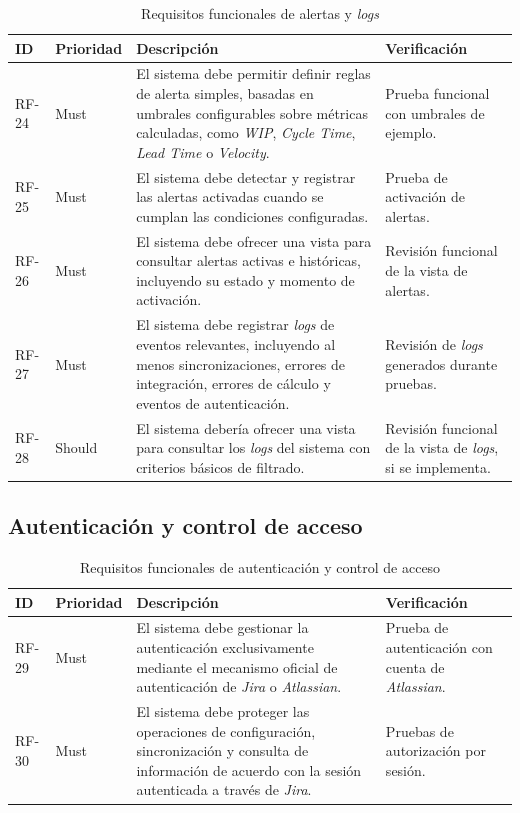{\renewcommand{\arraystretch}{1.28}\footnotesize
\begin{longtable}{p{1.35cm}p{1.65cm}p{6.9cm}p{2.9cm}}
\caption{Requisitos funcionales de alertas y \textit{logs}}\label{tab:rf-alertas-logs}\\
\toprule
\textbf{ID} & \textbf{Prioridad} & \textbf{Descripción} & \textbf{Verificación} \\
\midrule
RF-24 & Must & El sistema debe permitir definir reglas de alerta simples, basadas en umbrales configurables sobre métricas calculadas, como \textit{WIP}, \textit{Cycle Time}, \textit{Lead Time} o \textit{Velocity}. & Prueba funcional con umbrales de ejemplo. \\
RF-25 & Must & El sistema debe detectar y registrar las alertas activadas cuando se cumplan las condiciones configuradas. & Prueba de activación de alertas. \\
RF-26 & Must & El sistema debe ofrecer una vista para consultar alertas activas e históricas, incluyendo su estado y momento de activación. & Revisión funcional de la vista de alertas. \\
RF-27 & Must & El sistema debe registrar \textit{logs} de eventos relevantes, incluyendo al menos sincronizaciones, errores de integración, errores de cálculo y eventos de autenticación. & Revisión de \textit{logs} generados durante pruebas. \\
RF-28 & Should & El sistema debería ofrecer una vista para consultar los \textit{logs} del sistema con criterios básicos de filtrado. & Revisión funcional de la vista de \textit{logs}, si se implementa. \\
\bottomrule
\end{longtable}
\vspace{0.45em}
}

\subsection{Autenticación y control de acceso}

{\renewcommand{\arraystretch}{1.28}\footnotesize
\begin{longtable}{p{1.35cm}p{1.65cm}p{6.9cm}p{2.9cm}}
\caption{Requisitos funcionales de autenticación y control de acceso}\label{tab:rf-autenticacion-control-acceso}\\
\toprule
\textbf{ID} & \textbf{Prioridad} & \textbf{Descripción} & \textbf{Verificación} \\
\midrule
RF-29 & Must & El sistema debe gestionar la autenticación exclusivamente mediante el mecanismo oficial de autenticación de \textit{Jira} o \textit{Atlassian}. & Prueba de autenticación con cuenta de \textit{Atlassian}. \\
RF-30 & Must & El sistema debe proteger las operaciones de configuración, sincronización y consulta de información de acuerdo con la sesión autenticada a través de \textit{Jira}. & Pruebas de autorización por sesión. \\
\bottomrule
\end{longtable}
\vspace{0.45em}
}

